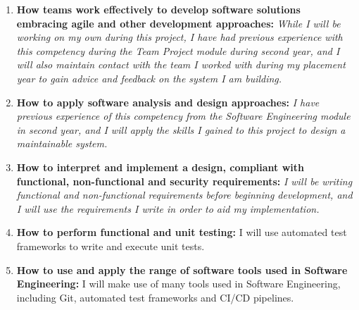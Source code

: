 \documentclass[12pt]{article}
\begin{document}
\begin{enumerate}
		\item \textbf{How teams work effectively to develop software solutions embracing agile and other development approaches:} \textit{While I will be working on my own during this project, I have had previous experience with this competency during the Team Project module during second year, and I will also maintain contact with the team I worked with during my placement year to gain advice and feedback on the system I am building.}
		\item \textbf{How to apply software analysis and design approaches:} \textit{I have previous experience of this competency from the Software Engineering module in second year, and I will apply the skills I gained to this project to design a maintainable system.}
		\item \textbf{How to interpret and implement a design, compliant with functional, non-functional and security requirements:} \textit{I will be writing functional and non-functional requirements before beginning development, and I will use the requirements I write in order to aid my implementation.}
		\item \textbf{How to perform functional and unit testing:} I will use automated test frameworks to write and execute unit tests.
		\item \textbf{How to use and apply the range of software tools used in Software Engineering:} I will make use of many tools used in Software Engineering, including Git, automated test frameworks and CI/CD pipelines.
	\end{enumerate}
\end{document}
